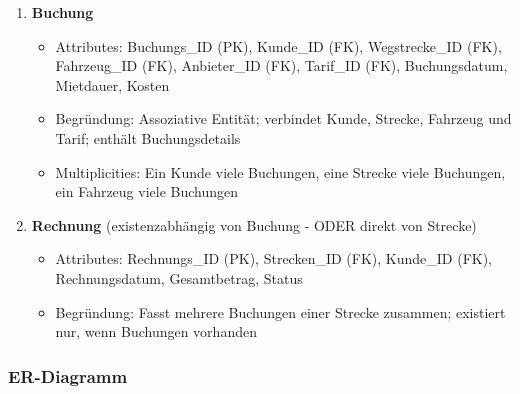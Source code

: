 \documentclass[12pt,a4paper]{article}
\begin{document}
\begin{enumerate}
    \item \textbf{Buchung}
    \begin{itemize}
        \item Attributes: Buchungs\_ID (PK), Kunde\_ID (FK), Wegstrecke\_ID (FK), Fahrzeug\_ID (FK), Anbieter\_ID (FK), Tarif\_ID (FK), Buchungsdatum, Mietdauer, Kosten
        \item Begründung: Assoziative Entität; verbindet Kunde, Strecke, Fahrzeug und Tarif; enthält Buchungsdetails
        \item Multiplicities: Ein Kunde viele Buchungen, eine Strecke viele Buchungen, ein Fahrzeug viele Buchungen
    \end{itemize}

    \item \textbf{Rechnung} (existenzabhängig von Buchung - ODER direkt von Strecke)
    \begin{itemize}
        \item Attributes: Rechnungs\_ID (PK), Strecken\_ID (FK), Kunde\_ID (FK), Rechnungsdatum, Gesamtbetrag, Status
        \item Begründung: Fasst mehrere Buchungen einer Strecke zusammen; existiert nur, wenn Buchungen vorhanden
    \end{itemize}
\end{enumerate}

\subsubsection*{ER-Diagramm}
\end{document}
